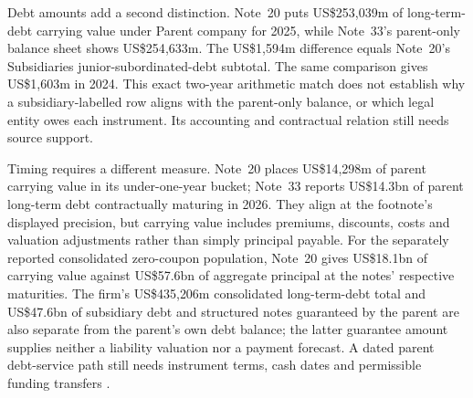 Debt amounts add a second distinction. Note~20 puts US\$253{,}039m of
long-term-debt carrying value under Parent company for 2025, while Note~33's
parent-only balance sheet shows US\$254{,}633m. The US\$1{,}594m difference
equals Note~20's Subsidiaries junior-subordinated-debt subtotal. The same
comparison gives US\$1{,}603m in 2024. This exact two-year arithmetic match
does not establish why a subsidiary-labelled row aligns with the parent-only
balance, or which legal entity owes each instrument. Its accounting and
contractual relation still needs source support.

Timing requires a different measure. Note~20 places US\$14{,}298m of parent
carrying value in its under-one-year bucket; Note~33 reports US\$14.3bn of
parent long-term debt contractually maturing in 2026. They align at the
footnote's displayed precision, but carrying value includes premiums,
discounts, costs and valuation adjustments rather than simply principal
payable. For the separately reported consolidated zero-coupon population,
Note~20 gives US\$18.1bn of carrying value against US\$57.6bn of aggregate
principal at the notes' respective maturities. The firm's US\$435{,}206m
consolidated long-term-debt total and US\$47.6bn of subsidiary debt and
structured notes guaranteed by the parent are also separate from the parent's
own debt balance; the latter guarantee amount supplies neither a liability
valuation nor a payment forecast. A dated parent debt-service path still needs
instrument terms, cash dates and permissible funding transfers
\citep[pp.~281--282, 310--311]{jpmorgan2025tenk}.

